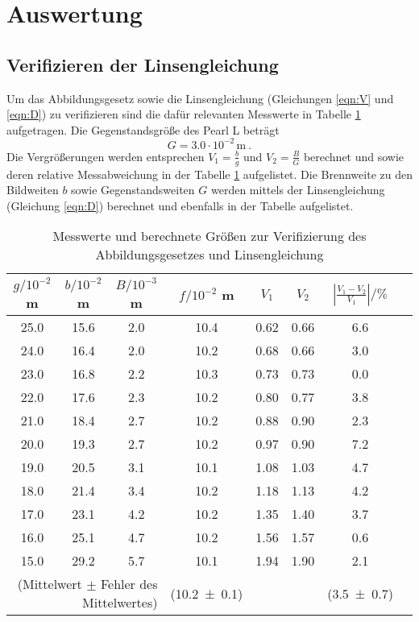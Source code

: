 \section{Auswertung}
\label{sec:Auswertung}
\subsection{Verifizieren der Linsengleichung}
Um das Abbildungsgesetz sowie die Linsengleichung (Gleichungen \eqref{eqn:V} und \eqref{eqn:D}) zu verifizieren sind die dafür relevanten Messwerte in Tabelle \ref{tab:VdA} aufgetragen. Die Gegenstandsgröße des Pearl L beträgt 
\begin{equation}
  G = 3.0 \cdot 10^{-2} \, \text{m} \ .
\end{equation} 
Die Vergrößerungen werden entsprechen $V_1 = \frac{b}{g}$ und $V_2 = \frac{B}{G}$ berechnet und sowie deren relative Messabweichung in der Tabelle \ref{tab:VdA} aufgelistet. Die Brennweite zu den Bildweiten $b$ sowie Gegenstandsweiten $G$ werden mittels der Linsengleichung (Gleichung \eqref{eqn:D}) berechnet und ebenfalls in der Tabelle aufgelistet. 
\begin{table}
  \centering
  \begin{tabular}{c c c | c | c c c c}
    \toprule
    $g / 10^{-2}$ m & $b / 10^{-2}$ m & $B / 10^{-3}$ m & $f / 10^{-2}$ m & $V_1$ & $V_2$ & $\left\lvert \frac{V_1 - V_2}{V_1} \right\rvert / \% $\\
   \midrule
    25.0 & 15.6 & 2.0 & 10.4 & 0.62   & 0.66	& 6.6 	\\
    24.0 & 16.4 & 2.0 & 10.2 & 0.68   & 0.66	& 3.0	\\
    23.0 & 16.8 & 2.2 & 10.3 & 0.73   & 0.73	& 0.0	\\
    22.0 & 17.6 & 2.3 & 10.2 & 0.80   & 0.77	& 3.8	\\
    21.0 & 18.4 & 2.7 & 10.2 & 0.88   & 0.90	& 2.3	\\
    20.0 & 19.3 & 2.7 & 10.2 & 0.97   & 0.90	& 7.2	\\
    19.0 & 20.5 & 3.1 & 10.1 & 1.08   & 1.03	& 4.7	\\
    18.0 & 21.4 & 3.4 & 10.2 & 1.18   & 1.13	& 4.2	\\
    17.0 & 23.1 & 4.2 & 10.2 & 1.35   & 1.40	& 3.7	\\
    16.0 & 25.1 & 4.7 & 10.2 & 1.56   & 1.57	& 0.6	\\
    15.0 & 29.2 & 5.7 & 10.1 & 1.94   & 1.90	& 2.1	\\
    \midrule
    \multicolumn{3}{r|}{(Mittelwert $\pm$ Fehler des Mittelwertes)}&(\num {10.2 +- 0.1}) & & & (\num{3.5 +- 0.7})\\
    \bottomrule
  \end{tabular}
  \caption{Messwerte und berechnete Größen zur Verifizierung des Abbildungsgesetzes und Linsengleichung}
  \label{tab:VdA}
\end{table}
